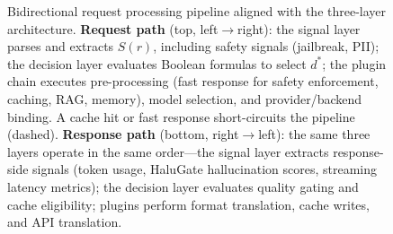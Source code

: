\begin{figure}[t]
{%
}
\caption{Bidirectional request processing pipeline aligned with the three-layer architecture.  \textbf{Request path} (top, left$\to$right): the signal layer parses and extracts $S(r)$, including safety signals (jailbreak, PII); the decision layer evaluates Boolean formulas to select $d^*$; the plugin chain executes pre-processing (fast response for safety enforcement, caching, RAG, memory), model selection, and provider/backend binding.  A cache hit or fast response short-circuits the pipeline (dashed).  \textbf{Response path} (bottom, right$\to$left): the same three layers operate in the same order---the signal layer extracts response-side signals (token usage, HaluGate hallucination scores, streaming latency metrics); the decision layer evaluates quality gating and cache eligibility; plugins perform format translation, cache writes, and API translation.}
\label{fig:extproc_pipeline}
\end{figure}

